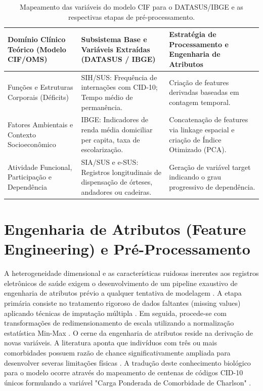 \documentclass[12pt,openright,oneside,a4paper,brazil]{abntex2}
\begin{document}
\begin{table}[htb]
\centering
\caption{Mapeamento das variáveis do modelo CIF para o DATASUS/IBGE e as respectivas etapas de pré-processamento.}
\label{tab:cif_datasus}
\begin{tabular}{|p{4cm}|p{5.5cm}|p{5.5cm}|}
\hline
\textbf{Domínio Clínico Teórico (Modelo CIF/OMS)} & \textbf{Subsistema Base e Variáveis Extraídas (DATASUS / IBGE)} & \textbf{Estratégia de Processamento e Engenharia de Atributos} \\ \hline
Funções e Estruturas Corporais (Déficits) & SIH/SUS: Frequência de internações com CID-10; Tempo médio de permanência. & Criação de features derivadas baseadas em contagem temporal. \\ \hline
Fatores Ambientais e Contexto Socioeconômico & IBGE: Indicadores de renda média domiciliar per capita, taxa de escolarização. & Concatenação de features via linkage espacial e criação de Índice Otimizado (PCA). \\ \hline
Atividade Funcional, Participação e Dependência & SIA/SUS e e-SUS: Registros longitudinais de dispensação de órteses, andadores ou cadeiras. & Geração de variável target indicando o grau progressivo de dependência. \\ \hline
\end{tabular}
\end{table}

\section{Engenharia de Atributos (Feature Engineering) e Pré-Processamento}
A heterogeneidade dimensional e as características ruidosas inerentes aos registros eletrônicos de saúde exigem o desenvolvimento de um pipeline exaustivo de engenharia de atributos prévio a qualquer tentativa de modelagem \cite{ref13, ref26, ref27}. A etapa primária consiste no tratamento rigoroso de dados faltantes (missing values) aplicando técnicas de imputação múltipla \cite{ref10, ref28}. Em seguida, procede-se com transformações de redimensionamento de escala utilizando a normalização estatística Min-Max \cite{ref29}. O cerne da engenharia de atributos reside na derivação de novas variáveis. A literatura aponta que indivíduos com três ou mais comorbidades possuem razão de chance significativamente ampliada para desenvolver severas limitações físicas \cite{ref6, ref30}. A tradução deste conhecimento biológico para o modelo ocorre através do mapeamento de centenas de códigos CID-10 únicos formulando a variável "Carga Ponderada de Comorbidade de Charlson" \cite{ref13, ref27}.
\end{document}
